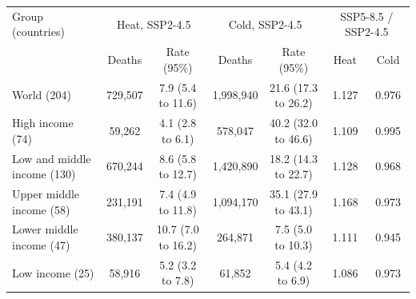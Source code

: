 \begin{tabular}{lcccccc}
\toprule
Group (countries) & \multicolumn{2}{c}{Heat, SSP2-4.5} & \multicolumn{2}{c}{Cold, SSP2-4.5} & \multicolumn{2}{c}{SSP5-8.5 / SSP2-4.5} \\ & Deaths & Rate (95\%) & Deaths & Rate (95\%) & Heat & Cold \\
\midrule
World (204) & 729,507 & 7.9 (5.4 to 11.6) & 1,998,940 & 21.6 (17.3 to 26.2) & 1.127 & 0.976 \\
High income (74) & 59,262 & 4.1 (2.8 to 6.1) & 578,047 & 40.2 (32.0 to 46.6) & 1.109 & 0.995 \\
Low and middle income (130) & 670,244 & 8.6 (5.8 to 12.7) & 1,420,890 & 18.2 (14.3 to 22.7) & 1.128 & 0.968 \\
Upper middle income (58) & 231,191 & 7.4 (4.9 to 11.8) & 1,094,170 & 35.1 (27.9 to 43.1) & 1.168 & 0.973 \\
Lower middle income (47) & 380,137 & 10.7 (7.0 to 16.2) & 264,871 & 7.5 (5.0 to 10.3) & 1.111 & 0.945 \\
Low income (25) & 58,916 & 5.2 (3.2 to 7.8) & 61,852 & 5.4 (4.2 to 6.9) & 1.086 & 0.973 \\
\bottomrule
\end{tabular}
